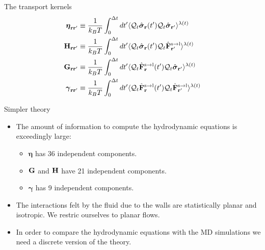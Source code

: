 \documentclass{beamer}
\begin{document}
\begin{frame}{The transport kernels}
\begin{align}
  \boldsymbol{\eta}_{{\bf  r}{\bf r}'} &\equiv
\frac{1}{k_BT}\int_0^{\Delta t} dt'\langle 
{\cal Q}_t\hat{\boldsymbol{\sigma}}_{{\bf r}}(t')
{\cal Q}_t\hat{\boldsymbol{\sigma}}_{{\bf r}'}\rangle^{\lambda(t)}
\nonumber \\
{\bf H}_{{\bf r}{\bf r}'}&\equiv\frac{1}{k_BT}\int_0^{\Delta t} dt'
\langle {\cal Q}_t\hat{\boldsymbol{\sigma}}_{{\bf r}}(t')
{\cal Q}_t\hat{\bf F}^{\rm s\to l}_{{\bf r}'}\rangle^{\lambda(t)}
\nonumber\\
{\bf G}_{{\bf r}{\bf r}'}&\equiv\frac{1}{k_BT}\int_0^{\Delta t} dt'
\langle {\cal Q}_t\hat{\bf F}^{\rm s\to l}_{{\bf r}}(t')
{\cal Q}_t\hat{\boldsymbol{\sigma}}_{{\bf r}'}\rangle^{\lambda(t)}
\nonumber\\
\boldsymbol{\gamma}_{{\bf  r}{\bf r}'}&\equiv\frac{1}{k_BT}\int_0^{\Delta t} dt'
\langle 
{\cal Q}_t\hat{\bf F}^{\rm s\to l}_{{\bf r}}(t')
{\cal Q}_t\hat{\bf F}^{\rm s\to l}_{{\bf r}'}\rangle^{\lambda(t)}
\nonumber
\end{align}
\end{frame}

\begin{frame}{Simpler theory}
  \begin{itemize}
    \item The amount of information to compute the hydrodynamic equations is exceedingly large:
      \begin{itemize}
        \item $\boldsymbol{\eta}$ has 36 independent components. 
        \item ${\bf G}$ and ${\bf H}$ have 21 independent components. 
        \item $\boldsymbol{\gamma}$ has 9 independent components. 
      \end{itemize}
    \item  The interactions felt by the fluid due to the walls are statistically planar and isotropic. We restric ourselves to planar flows. 
    \item In order to compare the hydrodynamic equations with the MD simulations we need a discrete version of the theory. 
    \end{itemize}
\end{frame}
\end{document}

